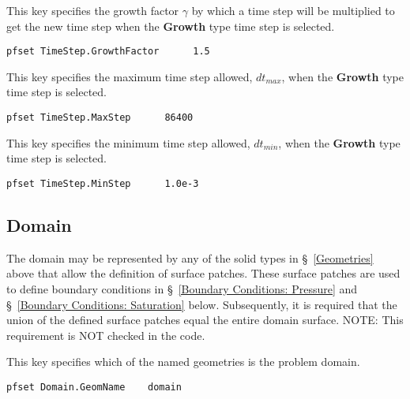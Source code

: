 {
This key specifies the growth factor $\gamma$ by which a time step will be
multiplied to get the new time step when the {\bf Growth} type time step is
selected. 
}
\begin{display}\begin{verbatim}
pfset TimeStep.GrowthFactor      1.5
\end{verbatim}\end{display}

{
This key specifies the maximum time step allowed, $dt_{max}$, when the {\bf
Growth} type time step is selected.
}
\begin{display}\begin{verbatim}
pfset TimeStep.MaxStep      86400
\end{verbatim}\end{display}

{
This key specifies the minimum time step allowed, $dt_{min}$, when the {\bf
Growth} type time step is selected.
}
\begin{display}\begin{verbatim}
pfset TimeStep.MinStep      1.0e-3
\end{verbatim}\end{display}


\subsection{Domain}
\label{Domain}

The domain may be represented by any of the solid types in
\S~\ref{Geometries} above that allow the definition of surface patches.
These surface patches are used to define boundary conditions in
\S~\ref{Boundary Conditions: Pressure} and
\S~\ref{Boundary Conditions: Saturation} below.
Subsequently, it is required that the union of the defined surface
patches equal the entire domain surface.  NOTE: This requirement is NOT checked
in the code.

{
This key specifies which of the named geometries is the problem domain.
}
\begin{display}\begin{verbatim}
pfset Domain.GeomName    domain
\end{verbatim}\end{display}

